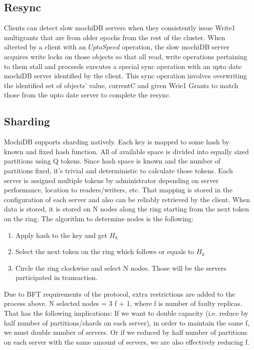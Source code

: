 \documentclass[letterpaper,twocolumn,10pt]{article}
\begin{document}
\subsection{Resync}
Clients can detect slow mochiDB servers when they consistently issue Write1 multigrants that are from older epochs from the rest of the cluster. When alterted by a client with an $UptoSpeed$ operation, the slow mochiDB server acquires write locks on those objects so that all read, write operations pertaining to them stall and proceeds executes a special sync operation with an upto date mochiDB server identified by the client. This sync operation involves overwriting the identified set of objects' value, currentC and given Wrie1 Grants to match those from the upto date server to complete the resync.

\subsection{Sharding}
MochiDB supports sharding natively. Each key is mapped to some hash by known and fixed hash function. All of available space is divided into equally sized partitions using Q tokens. Since hash space is known and the number of partitions fixed, it’s trivial and deterministic to calculate those tokens.
Each server is assigned multiple tokens by administrator depending on server performance, location to readers/writers, etc. That mapping is stored in the configuration of each server and also can be reliably retrieved by the client. When data is stored, it is stored on N nodes along the ring starting from the next token on the ring. The algorithm to determine nodes is the following:
\begin{enumerate}[noitemsep, topsep=0pt,]
  \item Apply hash to the key and get $H_{k}$
  \item Select the next token on the ring which follows or equals to $H_{k}$
  \item Circle the ring clockwise and select N nodes. Those will be the servers participated in transaction.
\end{enumerate}

Due to BFT requirements of the protocol, extra restrictions are added to the process above. N selected nodes = 3 f + 1, where f is number of faulty replicas. That has the following implications: If we want to double capacity (i.e. reduce by half number of partitions/shards on each server), in order to maintain the same f, we must double number of servers. Or if we reduced by half number of partitions on each server with the same amount of servers, we are also effectively reducing f.
\end{document}

